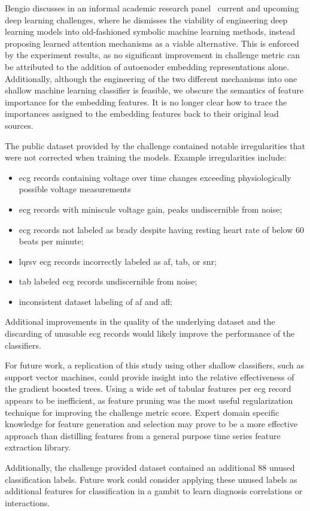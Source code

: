 \documentclass[\main/thesis.tex]{subfiles}
\begin{document}
Bengio discusses in an informal academic research panel~\cite{2020-yoshua-dlc} current and upcoming deep learning challenges, where he dismisses the viability of engineering deep learning models into old-fashioned symbolic machine learning methods, instead proposing learned attention mechanisms as a viable alternative.
This is enforced by the experiment results, as no significant improvement in challenge metric can be attributed to the addition of autoenoder embedding representations alone.
Additionally, although the engineering of the two different mechanisms into one shallow machine learning classifier is feasible, we obscure the semantics of feature importance for the embedding features.
It is no longer clear how to trace the importances assigned to the embedding features back to their original lead sources.

The public dataset provided by the challenge contained notable irregularities that were not corrected when training the models.
Example irregularities include: 
\begin{itemize}
    \item \gls{ecg} records containing voltage over time changes exceeding physiologically possible voltage measurements
    \item \gls{ecg} records with miniscule voltage gain, peaks undiscernible from noise;
    \item \gls{ecg} records not labeled as \gls{brady} despite having resting heart rate of below 60 beats per minute;
    \item \gls{lqrsv} \gls{ecg} records incorrectly labeled as \gls{af}, \gls{tab}, or \gls{snr};
    \item \gls{tab} labeled \gls{ecg} records undiscernible from noise;
    \item inconsistent dataset labeling of \gls{af} and \gls{afl};
\end{itemize}
Additional improvements in the quality of the underlying dataset and the discarding of unusable \gls{ecg} records would likely improve the performance of the classifiers.

For future work, a replication of this study using other shallow classifiers, such as support vector machines, could provide insight into the relative effectiveness of the gradient boosted trees.
Using a wide set of tabular features per \gls{ecg} record appears to be inefficient, as feature pruning was the most useful regularization technique for improving the challenge metric score.
Expert domain specific knowledge for feature generation and selection may prove to be a more effective approach than distilling features from a general purpose time series feature extraction library.

Additionally, the challenge provided dataset contained an additional 88 unused classification labels.
Future work could consider applying these unused labels as additional features for classification in a gambit to learn diagnosis correlations or interactions.
\end{document}
